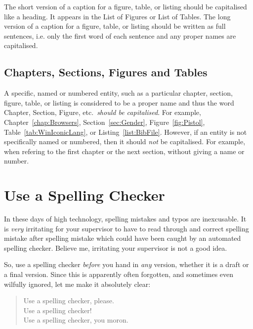 The short version of a caption for a figure, table, or listing should
be capitalised like a heading. It appears in the List of Figures or
List of Tables. The long version of a caption for a figure, table, or
listing should be written as full sentences, i.e. only the first word
of each sentence and any proper names are capitalised.



\subsection{Chapters, Sections, Figures and Tables}

A specific, named or numbered entity, such as a particular chapter,
section, figure, table, or listing is considered to be a proper name
and thus the word Chapter, Section, Figure, etc.\ \emph{should be
  capitalised}. For example, Chapter~\ref{chap:Browsers},
Section~\ref{sec:Gender}, Figure~\ref{fig:Pistol},
Table~\ref{tab:WinIconicLang}, or Listing~\ref{list:BibFile}. However,
if an entity is not specifically named or numbered, then it should
\emph{not} be capitalised. For example, when refering to the first
chapter or the next section, without giving a name or number.









\section{Use a Spelling Checker}

In these days of high technology, spelling mistakes and typos are
inexcusable. It is \emph{very} irritating for your supervisor to have
to read through and correct spelling mistake after spelling mistake
which could have been caught by an automated spelling checker.
Believe me, irritating your supervisor is not a good idea.

So, use a spelling checker \emph{before} you hand in \emph{any}
version, whether it is a draft or a final version.
Since this is apparently often forgotten, and sometimes even wilfully
ignored, let me make it absolutely clear:
\begin{quote}
\begin{em}
Use a spelling checker, please. \\
Use a spelling checker! \\
Use a spelling checker, you moron. \\
\end{em}
\end{quote}






